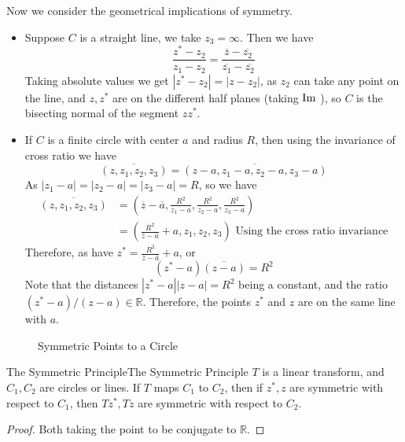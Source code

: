 \documentclass[../main.tex]{subfiles}
\begin{document}
Now we consider the geometrical implications of symmetry.
\begin{itemize}
\item Suppose $C$ is a straight line, we take $z_3 = \infty $. Then we have
	\begin{equation*}
	\frac{z^*-z_2}{z_1-z_2} = \frac{\overline{z}-\overline{z_2}}{\overline{z_1}-\overline{z_2}}
	\end{equation*}
	Taking absolute values we get $\left|z^*-z_2\right| = \left|z-z_2\right|$, as $z_2$ can take any point on the line, and $z,z^*$ are on the different half planes (taking $\operatorname{Im}$ ), so $C$ is the bisecting normal of the segment $zz^*$.
\item If $C$ is a finite circle with center $a$ and radius $R$, then using the invariance of cross ratio we have
	\begin{equation*}
	\overline{(z,z_1,z_2,z_3)} = \overline{(z-a,z_1-a,z_2-a,z_3-a)}
	\end{equation*}
	As $\left|z_1-a\right| = \left|z_2-a\right| = \left|z_3-a\right| = R$, so we have
	\begin{equation*}
	\begin{aligned}
		\overline{(z,z_1,z_2,z_3)} &= \left(\overline{z}-\overline{a}, \frac{R^2}{z_1-a}, \frac{R^2}{z_2-a}, \frac{R^2}{z_3-a}\right) \\
					   &= \left(\frac{R^2}{\overline{z}-\overline{a}}+a,z_1,z_2,z_3\right) \text{ Using the cross ratio invariance}
	\end{aligned}
	\end{equation*}
	Therefore, as have $\displaystyle z^* = \frac{R^2}{\overline{z}-\overline{a}}+a$, or
	\begin{equation}
		(z^*-a) \overline{(z-a)} = R^2
	\end{equation}
	Note that the distances $\left|z^*-a\right|\left|z-a\right| = R^2$ being a constant, and the ratio  $(z^*-a) / (z-a)\in \mathbb{R}$. Therefore, the points $z^*$ and $z$ are on the same line with $a$.
\end{itemize}

\begin{figure}[ht]
    \centering
    \caption{Symmetric Points to a Circle}
    \label{fig:symmetric-points-to-a-circle}
\end{figure}

\begin{theorem}{The Symmetric Principle}{The Symmetric Principle}
$T$ is a linear transform, and $C_1,C_2$ are circles or lines. If $T$ maps $C_1$ to $C_2$, then if $z^*,z$ are symmetric with respect to $C_1$, then $Tz^*,Tz$ are symmetric with respect to $C_2$.
\end{theorem}
\begin{proof}
Both taking the point to be conjugate to $\mathbb{R}$.
\end{proof}
\end{document}
